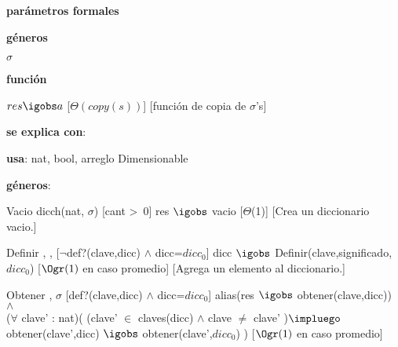 \begin{Interfaz}

	\textbf{parámetros formales}\parindent\\
	\parbox{1.7cm}{\textbf{géneros}} $\sigma$\\
	\parbox[t]{1.7cm}{\textbf{función}}\parbox[t]{\textwidth-2\parindent-1.7cm}{%
	    	{$res \igobs a$}
		[$\Theta(copy(s))$]
		[función de copia de $\sigma$'s]
	}
	
	\textbf{se explica con}: 
	
	\textbf{usa}: nat, bool, arreglo Dimensionable
	
	\textbf{géneros}: 
	
	
	\InterfazFuncion
	{Vacio}
	{}
	{dicch(nat, $\sigma$)}
	[cant >\ 0]
	{res $\igobs$ vacio}
	[$\Theta$(1)]
	[Crea un diccionario vacio.]
	
	\InterfazFuncion
	{Definir}
	{, , }
	{}
	[$\neg$def?(clave,dicc) $\land$ dicc=$dicc_0$]
	{dicc $\igobs$ Definir(clave,significado,$dicc_0$)}
	[$\Ogr(1)$ en caso promedio]
	[Agrega un elemento al diccionario.]	
	
	\InterfazFuncion
	{Obtener}
	{, }
	{$\sigma$}
	[def?(clave,dicc) $\land$ dicc=$dicc_0$]
	{alias(res $\igobs$ obtener(clave,dicc)) 
		$\land$\\ 
		($\forall$ clave' : nat)( (clave' $\in$ claves(dicc) $\land$ clave $\neq$ clave' )$\impluego$ obtener(clave',dicc) $\igobs$ obtener(clave',$dicc_0$) )}
	[$\Ogr(1)$ en caso promedio]
	
\end{Interfaz}

